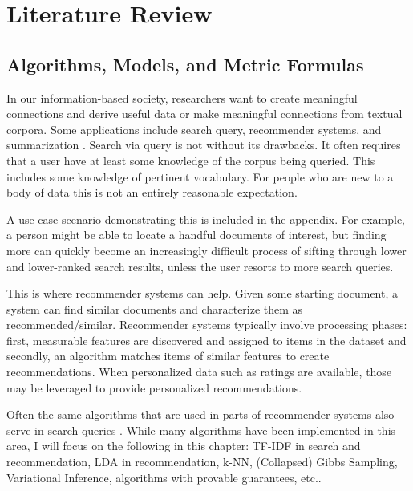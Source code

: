 \chapter{Literature Review}

\section{Algorithms, Models, and Metric Formulas}

In our information-based society, researchers want to create meaningful connections and derive useful data or make meaningful connections from textual corpora. Some applications include search query, recommender systems, and summarization \citep{Mani01summarizationevaluation:2001}.
Search via query is not without its drawbacks. It often requires that a user have at least some knowledge of the corpus being queried. This includes some knowledge of pertinent vocabulary. For people who are new to a body of data
this is not an entirely reasonable expectation.

A use-case scenario demonstrating this is included in the appendix. For example, a person might be able to locate a handful documents of interest, but finding more can quickly become an increasingly difficult process of sifting through lower and lower-ranked search results, unless the user resorts to more search queries.

This is where recommender systems can help. Given some starting document, a system can find similar documents and characterize them as recommended/similar.
 Recommender systems typically involve processing phases: first, measurable features are discovered and assigned to items in the dataset and secondly, an algorithm matches items of similar features to create recommendations. When personalized data such as ratings are available, those may be leveraged to provide personalized recommendations.

Often the same algorithms that are used in parts of recommender systems also serve in search queries \citep{}. While many algorithms have been implemented in this area, I will focus on the following in this chapter: TF-IDF in search and recommendation, LDA in recommendation, k-NN, (Collapsed) Gibbs Sampling, Variational Inference, algorithms with provable guarantees, etc..

